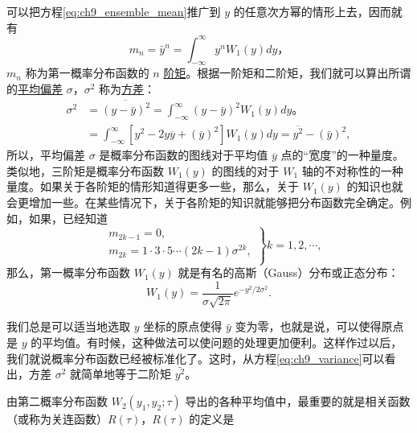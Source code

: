 可以把方程\eqref{eq:ch9_ensemble_mean}推广到 $ y $ 的任意次方幂的情形上去，因而就有
\begin{equation}\label{eq:ch9_nth_moment}
m_n = \bar{y}^n = \int_{-\infty}^{\infty} y^n W_1(y)dy，
\end{equation}
$ m_n $ 称为第一概率分布函数的 $ n $ \underline{阶矩}。根据一阶矩和二阶矩，我们就可以算出所谓的\underline{平均偏差} $ \sigma $，$ \sigma^2 $ 称为\underline{方差}：
\begin{equation}\label{eq:ch9_variance}
\begin{aligned}
\sigma^2& = \overline{(y - \bar{y})^2} = \int_{-\infty}^{\infty} (y - \bar{y})^2 W_1(y)dy。\\
&= \int_{-\infty}^{\infty} \left[ y^2 - 2y \overline{y} + (\overline{y})^2 \right] W_1(y) dy = \overline{y^2} - (\bar{y})^2,
\end{aligned}
\end{equation}
所以，平均偏差 $ \sigma $ 是概率分布函数的图线对于平均值 $ \overline{y} $ 点的“宽度”的一种量度。类似地，三阶矩是概率分布函数 $ W_1(y) $ 的图线的对于 $ W_1 $ 轴的不对称性的一种量度。如果关于各阶矩的情形知道得更多一些，那么，关于 $ W_1(y) $ 的知识也就会更增加一些。在某些情况下，关于各阶矩的知识就能够把分布函数完全确定。例如，如果，已经知道
\begin{equation}\label{eq:ch9_moments_condition}
\left.
\begin{aligned}
&m_{2k-1} = 0, \\
&m_{2k} = 1 \cdot 3 \cdot 5 \cdots (2k-1) \sigma^{2k}, \\
\end{aligned}
\right\}k = 1, 2, \cdots,
\end{equation}
那么，第一概率分布函数 $ W_1(y) $ 就是有名的高斯（Gauss）分布或正态分布：
\begin{equation}\label{eq:ch9_gaussian}
W_1(y) = \frac{1}{\sigma \sqrt{2\pi}} e^{-y^2/2\sigma^2}.
\end{equation}

我们总是可以适当地选取 $ y $ 坐标的原点使得 $ \bar{y} $ 变为零，也就是说，可以使得原点是 $ y $ 的平均值。有时候，这种做法可以使问题的处理更加便利。这样作过以后，我们就说概率分布函数已经被标准化了。这时，从方程\eqref{eq:ch9_variance}可以看出，方差 $ \sigma^2 $ 就简单地等于二阶矩 $ \bar{y^2} $。

由第二概率分布函数 $ W_2(y_1,y_2;\tau) $ 导出的各种平均值中，最重要的就是相关函数（或称为关连函数）$ R(\tau) $，$ R(\tau) $ 的定义是

